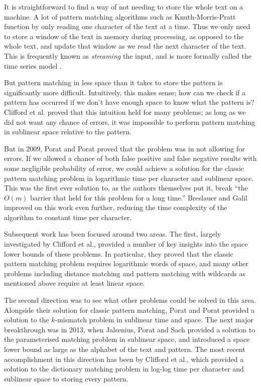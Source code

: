 \documentclass[a4paper,11pt]{article}
\begin{document}
    It is straightforward to find a way of not needing to store the whole text on a machine. A lot of pattern matching algorithms such as Knuth-Morris-Pratt \cite{kmp} function by only reading one character of the text at a time. Thus we only need to store a window of the text in memory during processing, as opposed to the whole text, and update that window as we read the next character of the text. This is frequently known as \textit{streaming} the input, and is more formally called the time series model \cite{TCS-002}.

    But pattern matching in less space than it takes to store the pattern is significantly more difficult. Intuitively, this makes sense; how can we check if a pattern has occurred if we don't have enough space to know what the pattern is? Clifford et al.\@ \cite{clifford:black-box} proved that this intuition held for many problems; as long as we did not want any chance of errors, it was impossible to perform pattern matching in sublinear space relative to the pattern.

    But in 2009, Porat and Porat \cite{5438620} proved that the problem was in not allowing for errors. If we allowed a chance of both false positive and false negative results with some negligible probability of error, we could achieve a solution for the classic pattern matching problem in logarithmic time per character and sublinear space. This was the first ever solution to, as the authors themselves put it, break ``the $O(m)$ barrier that held for this problem for a long time.'' Breslauer and Galil \cite{Breslauer:2014:RSS:2660854.2635814} improved on this work even further, reducing the time complexity of the algorithm to constant time per character.

    Subsequent work has been focused around two areas. The first, largely investigated by Clifford et al.\@ \cite{DBLP:journals/corr/abs-1106-4412}, provided a number of key insights into the space lower bounds of these problems. In particular, they proved that the classic pattern matching problem requires logarithmic words of space, and many other problems including distance matching and pattern matching with wildcards as mentioned above require at least linear space.

    The second direction was to see what other problems could be solved in this area. Alongside their solution for classic pattern matching, Porat and Porat \cite{5438620} provided a solution to the $k$-mismatch problem in sublinear time and space. The next major breakthrough was in 2013, when Jalsenius, Porat and Sach \cite{JPS:2013} provided a solution to the parameterised matching problem in sublinear space, and introduced a space lower bound as large as the alphabet of the text and pattern. The most recent accomplishment in this direction has been by Clifford et al.\@ \cite{2015arXiv150406242C}, which provided a solution to the dictionary matching problem in log-log time per character and sublinear space to storing every pattern.
\end{document}
